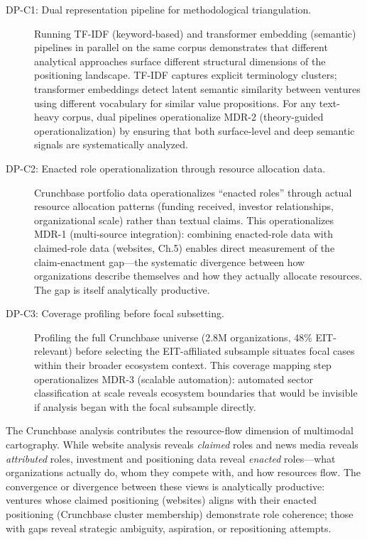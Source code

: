 \documentclass[../main.tex]{subfiles}
\begin{document}
\begin{description}
    \item[DP-C1: Dual representation pipeline for methodological triangulation.] Running TF-IDF (keyword-based) and transformer embedding (semantic) pipelines in parallel on the same corpus demonstrates that different analytical approaches surface different structural dimensions of the positioning landscape. TF-IDF captures explicit terminology clusters; transformer embeddings detect latent semantic similarity between ventures using different vocabulary for similar value propositions. For any text-heavy corpus, dual pipelines operationalize MDR-2 (theory-guided operationalization) by ensuring that both surface-level and deep semantic signals are systematically analyzed.

    \item[DP-C2: Enacted role operationalization through resource allocation data.] Crunchbase portfolio data operationalizes ``enacted roles'' through actual resource allocation patterns (funding received, investor relationships, organizational scale) rather than textual claims. This operationalizes MDR-1 (multi-source integration): combining enacted-role data with claimed-role data (websites, Ch.5) enables direct measurement of the claim-enactment gap---the systematic divergence between how organizations describe themselves and how they actually allocate resources. The gap is itself analytically productive.

    \item[DP-C3: Coverage profiling before focal subsetting.] Profiling the full Crunchbase universe (2.8M organizations, 48\% EIT-relevant) before selecting the EIT-affiliated subsample situates focal cases within their broader ecosystem context. This coverage mapping step operationalizes MDR-3 (scalable automation): automated sector classification at scale reveals ecosystem boundaries that would be invisible if analysis began with the focal subsample directly.
\end{description}

\begin{insightbox}
The Crunchbase analysis contributes the resource-flow dimension of multimodal cartography. While website analysis reveals \emph{claimed} roles and news media reveals \emph{attributed} roles, investment and positioning data reveal \emph{enacted} roles---what organizations actually do, whom they compete with, and how resources flow. The convergence or divergence between these views is analytically productive: ventures whose claimed positioning (websites) aligns with their enacted positioning (Crunchbase cluster membership) demonstrate role coherence; those with gaps reveal strategic ambiguity, aspiration, or repositioning attempts.
\end{insightbox}
\end{document}
